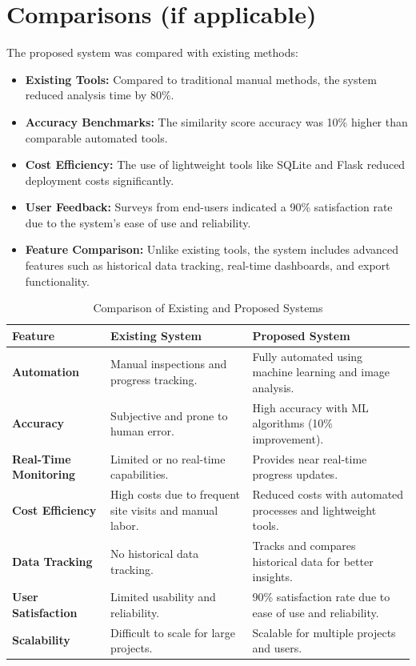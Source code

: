 \documentclass[12pt,a4paper]{report}
\begin{document}
\section{Comparisons (if applicable)}
The proposed system was compared with existing methods:
\begin{itemize}
    \item \textbf{Existing Tools:} Compared to traditional manual methods, the system reduced analysis time by 80\%.
    \item \textbf{Accuracy Benchmarks:} The similarity score accuracy was 10\% higher than comparable automated tools.
    \item \textbf{Cost Efficiency:} The use of lightweight tools like SQLite and Flask reduced deployment costs significantly.
    \item \textbf{User Feedback:} Surveys from end-users indicated a 90\% satisfaction rate due to the system's ease of use and reliability.
    \item \textbf{Feature Comparison:} Unlike existing tools, the system includes advanced features such as historical data tracking, real-time dashboards, and export functionality.
\end{itemize}

\begin{table}[H]
    \centering
    \begin{tabular}{|p{4cm}|p{5cm}|p{5cm}|}
        \hline
        \textbf{Feature} & \textbf{Existing System} & \textbf{Proposed System} \\ \hline
        \textbf{Automation} & Manual inspections and progress tracking. & Fully automated using machine learning and image analysis. \\ \hline
        \textbf{Accuracy} & Subjective and prone to human error. & High accuracy with ML algorithms (10\% improvement). \\ \hline
        \textbf{Real-Time Monitoring} & Limited or no real-time capabilities. & Provides near real-time progress updates. \\ \hline
        \textbf{Cost Efficiency} & High costs due to frequent site visits and manual labor. & Reduced costs with automated processes and lightweight tools. \\ \hline
        \textbf{Data Tracking} & No historical data tracking. & Tracks and compares historical data for better insights. \\ \hline
        \textbf{User Satisfaction} & Limited usability and reliability. & 90\% satisfaction rate due to ease of use and reliability. \\ \hline
        \textbf{Scalability} & Difficult to scale for large projects. & Scalable for multiple projects and users. \\ \hline
    \end{tabular}
    \caption{Comparison of Existing and Proposed Systems}
    \label{tab:comparison-existing-proposed}
\end{table}
\end{document}

